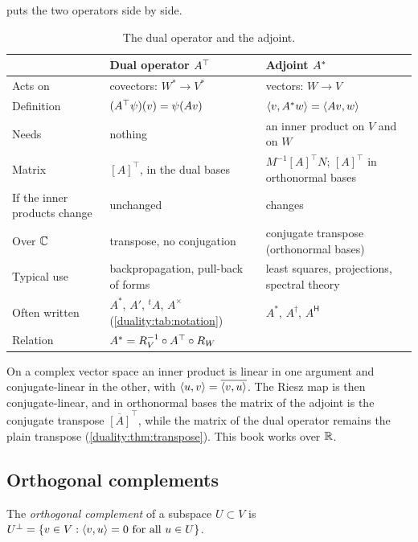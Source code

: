 \begin{notechapter}
 puts the two operators side by
side.

\begin{table}[ht]
\centering
\small
\begin{tabular}{@{}p{3.6cm}p{5cm}p{5cm}@{}}
\toprule
 & Dual operator $A^{\top}$ & Adjoint $A^{*}$ \\
\midrule
Acts on & covectors: $W^*\to V^*$ & vectors: $W\to V$ \\
Definition & $(A^{\top}\psi)(v) = \psi(Av)$
  & $\left\langle v, A^{*}w \right\rangle = \left\langle Av, w \right\rangle$ \\
Needs & nothing & an inner product on $V$ and on $W$ \\
Matrix & $[A]^\top$, in the dual bases
  & $M^{-1}[A]^\top N$; $[A]^\top$ in orthonormal bases \\
If the inner products change & unchanged & changes \\
Over $\mathbb{C}$ & transpose, no conjugation & conjugate transpose (orthonormal
  bases) \\
Typical use & backpropagation, pull-back of forms
  & least squares, projections, spectral theory \\
Often written & $A^*$, $A'$, ${}^t\!A$, $A^\times$
  (\cref{duality:tab:notation}) & $A^*$, $A^\dagger$, $A^{\mathsf H}$ \\
Relation & \multicolumn{2}{l}{$A^{*} = R_V^{-1}\circ A^{\top}\circ R_W$} \\
\bottomrule
\end{tabular}
\caption{The dual operator and the adjoint.}
\label{inner-products:tab:dual-adjoint}
\end{table}

\begin{remark}
On a complex vector space an inner product is linear in one argument and
conjugate-linear in the other, with $\left\langle u, v \right\rangle = \overline{\left\langle v, u \right\rangle}$. The
Riesz map is then conjugate-linear, and in orthonormal bases the matrix of
the adjoint is the conjugate transpose $\overline{[A]}^\top$, while the
matrix of the dual operator remains the plain transpose
(\cref{duality:thm:transpose}). This book works over $\mathbb{R}$.
\end{remark}

\subsection{Orthogonal complements}

\begin{definition}
The \emph{orthogonal complement} of a subspace $U\subset V$ is
$U^\perp = \{v\in V : \left\langle v, u \right\rangle = 0\text{ for all }u\in U\}$.
\end{definition}


\end{notechapter}
